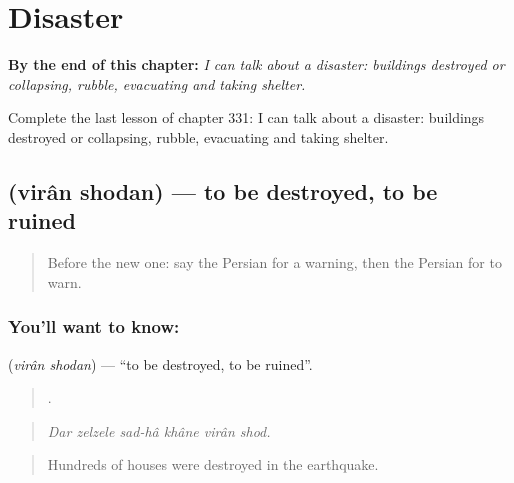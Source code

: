 
\chapter{Disaster}
\label{ch:fa-disaster}

\begin{chapteropening}
\textbf{By the end of this chapter:} \emph{I can talk about a disaster: buildings destroyed or collapsing, rubble, evacuating and taking shelter.}

Complete the last lesson of chapter 331: I can talk about a disaster: buildings destroyed or collapsing, rubble, evacuating and taking shelter.
\end{chapteropening}

\section[\texorpdfstring{\fa{ویران} \fa{شدن} (virân shodan)}{ویران شدن (virân shodan)}]{  (virân shodan) — to be destroyed, to be ruined}

\label{lesson:FA-C331-viran-shodan}



\begin{quote}
Before the new one: say the Persian for a warning, then the Persian for to warn.
\end{quote}

\subsection*{You'll want to know:  }
\textbf{ } (\emph{virân shodan}) — \textquotedblleft{}to be destroyed, to be ruined\textquotedblright{}.

\begin{quote}
     .
\end{quote}

\begin{quote}
\emph{Dar zelzele sad-hâ khâne virân shod.}
\end{quote}

\begin{quote}
Hundreds of houses were destroyed in the earthquake.
\end{quote}

